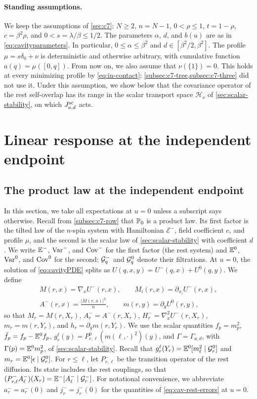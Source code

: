 \paragraph{Standing assumptions.}
We keep the assumptions of \cref{sec:c7}: $N\ge2$, $n=N-1$,
$0<\rho\le1$, $t=1-\rho$, $c=\beta^2\rho$, and $0<s=\lambda/\beta\le1/2$.
The parameters $\alpha$, $d$, and $b(u)$ are as in \eqref{eq:cavityparameters}. In
particular, $0\le\alpha\le\beta^2$ and $d\in[\beta^2/2,\beta^2]$. The
profile $\mu=s\delta_0+\nu$ is deterministic and otherwise arbitrary,
with cumulative function $a(q)=\mu([0,q])$. From now on, we also
assume that $\nu(\{1\})=0$. This holds at every minimizing profile by
\eqref{eq:in-contact}; \cref{subsec:c7-tree,subsec:c7-three} did not
use it. Under this assumption, we show below that the covariance
operator of the rest self-overlap has its range in the scalar
transport space $\mathcal H_\nu$ of \cref{sec:scalar-stability}, on
which $J^{\mathrm{sc}}_{a,d}$ acts.

\section{Linear response at the independent endpoint}
\label{subsec:c7-linear}

\subsection{The product law at the independent endpoint}

In this section, we take all expectations at $u=0$ unless a
subscript says otherwise. Recall from \cref{subsec:c7-row} that
$\mathbb P_0$ is a product law. Its first factor is the tilted law of the $n$-spin
system with Hamiltonian $\mathcal E^-$, field coefficient $c$, and profile
$\mu$, and the second is the scalar law of \cref{sec:scalar-stability}
with coefficient $d$. We
write $\mathbb E^-$, $\operatorname{Var}^-$, and $\operatorname{Cov}^-$ for the first factor (the rest
system) and $\mathbb E^0$, $\operatorname{Var}^0$, and $\operatorname{Cov}^0$ for the second;
$\mathcal G^-_q$ and $\mathcal G^0_q$ denote their filtrations. At $u=0$, the
solution of \eqref{eq:cavityPDE} splits as
$U(q,x,y)=U^-(q,x)+U^0(q,y)$. We define
\[
 \begin{gathered}
 M(r,x)=\nabla_xU^-(r,x),\qquad M_i(r,x)=\partial_{x_i}U^-(r,x),\\
 A^-(r,x)=\frac{|M(r,x)|^2}n,\qquad m(r,y)=\partial_yU^0(r,y),
 \end{gathered}
\]
so that $M_r=M(r,X_r)$, $A_r^-=A^-(r,X_r)$,
$H_r^-=\nabla_x^2U^-(r,X_r)$, $m_r=m(r,Y_r)$, and
$h_r=\partial_ym(r,Y_r)$. We use the scalar quantities $f_p=m_p^2$,
$\bar f_p=f_p-\mathbb E^0f_p$, $g_r^\ell(y)=P^0_{r,\ell}(m(\ell,\cdot)^2)(y)$,
and $\Gamma=\Gamma_{a,d}$, with $\Gamma(p)=\mathbb E^0m_p^2$, of
\cref{sec:scalar-stability}. Recall that
$g_r^\ell(Y_r)=\mathbb E^0[m_\ell^2\mid\mathcal G^0_r]$ and
$m_r=\mathbb E^0[\epsilon\mid\mathcal G^0_r]$. For $r\le\ell$, let
$P^-_{r,\ell}$ be the transition operator of the rest diffusion. Its
state includes the rest couplings, so that
$(P^-_{r,\ell}A^-_\ell)(X_r)=\mathbb E^-[A^-_\ell\mid\mathcal G^-_r]$. For
notational convenience, we abbreviate $a_r^-=a_r^-(0)$ and
$j_r^-=j_r^-(0)$ for the quantities of \eqref{eq:cav-rest-errors} at
$u=0$.

